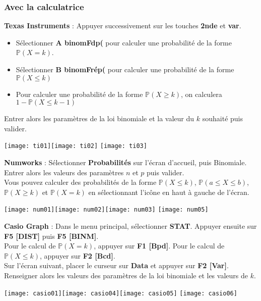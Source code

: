 \documentclass[11pt,fleqn, openany]{book} %
\begin{document}
\subsubsection{Avec la calculatrice}

\textbf{Texas Instruments} : Appuyer successivement sur les touches \textbf{2nde} et \textbf{var}.
\begin{itemize}
\item Sélectionner \textbf{A binomFdp(} pour calculer une probabilité de la forme $\mathbb{P}(X=k)$.
\item Sélectionner\textbf{ B binomFrép(} pour calculer une probabilité de la forme $\mathbb{P}(X\leqslant k)$
\item Pour calculer une probabilité de la forme $\mathbb{P}(X \geqslant k)$, on calculera $1-\mathbb{P}(X \leqslant k-1)$
\end{itemize}
Entrer alors les paramètres de la loi binomiale et la valeur du $k$ souhaité puis valider.

\texttt{[image: ti01]}\hfill \texttt{[image: ti02]} \hfill \texttt{[image: ti03]}

\textbf{Numworks} : Sélectionner \textbf{Probabilités} sur l'écran d'accueil, puis Binomiale. Entrer alors les valeurs des paramètres $n$ et $p$ puis valider.\\
Vous pouvez calculer des probabilités de la forme $\mathbb{P}(X\leqslant k)$, $\mathbb{P}(a\leqslant X \leqslant b)$, $\mathbb{P}(X \geqslant k)$ et $\mathbb{P}(X=k)$ en sélectionnant l'icône en haut à gauche de l'écran.

\vskip5pt

\texttt{[image: num01]}\hfill \texttt{[image: num02]}\hfill \texttt{[image: num03]} \hfill \texttt{[image: num05]}

\textbf{Casio Graph} : Dans le menu principal, sélectionner \textbf{STAT}. Appuyer ensuite sur \textbf{F5 [DIST]} puis \textbf{F5 [BINM]}.\\
Pour le calcul de $\mathbb{P}(X=k)$, appuyer sur \textbf{F1 [Bpd]}. Pour le calcul de $\mathbb{P}(X \leqslant k)$, appuyer sur \textbf{F2 [Bcd]}.\\
Sur l'écran suivant, placer le curseur sur \textbf{Data} et appuyer sur \textbf{F2 [Var]}. Renseigner alors les valeurs des paramètres de la loi binomiale et les valeurs de $k$.

\texttt{[image: casio01]}\hfill \texttt{[image: casio04]}\hfill \texttt{[image: casio05]} \hfill \texttt{[image: casio06]}
\end{document}
